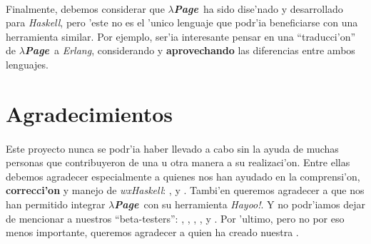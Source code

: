 \documentclass[a4paper]{article}
\newcommand{\haskell}{\textsl{Haskell}}
\newcommand{\hpage}{\textbf{\textsl{$\lambda$Page}}}
\begin{document}
\paragraph{}Finalmente, debemos considerar que \hpage\ ha sido dise'nado y desarrollado para \haskell, pero 'este no es el 'unico lenguaje que podr'ia beneficiarse con una herramienta similar.  Por ejemplo, ser'ia interesante pensar en una ``traducci'on'' de \hpage\ a \textsl{Erlang}, considerando y \textbf{aprovechando} las diferencias entre ambos lenguajes.

\newpage
\section{Agradecimientos}
\paragraph{}Este proyecto nunca se podr'ia haber llevado a cabo sin la ayuda de muchas personas que contribuyeron de una u otra manera a su realizaci'on.  Entre ellas debemos agradecer especialmente a quienes nos han ayudado en la comprensi'on, \textbf{correcci'on} y manejo de \textsl{wxHaskell}: ,  y . Tambi'en queremos agradecer a  que nos han permitido integrar \hpage\ con su herramienta \textsl{Hayoo!}.  Y no podr'iamos dejar de mencionar a nuestros ``beta-testers'': , , , ,  y .  Por 'ultimo, pero no por eso menos importante, queremos agradecer a  quien ha creado nuestra .
\end{document}
